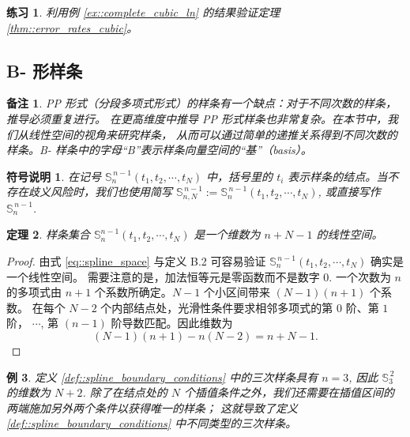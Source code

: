 \documentclass[a4paper]{ctexart}
\newtheorem{theorem}{定理}
\newtheorem{remark}{备注}
\newtheorem{notation}{符号说明}
\newtheorem{example}[theorem]{例}
\newtheorem{exercise}[theorem]{练习}
\numberwithin{theorem}{section}
\numberwithin{equation}{section}
\numberwithin{figure}{section}
\numberwithin{remark}{section}
\begin{document}
\begin{exercise}
    \label{exer::verify_thm312_by_ex38}
利用例 \ref{ex::complete_cubic_ln} 的结果验证定理 \ref{thm::error_rates_cubic}。
\end{exercise}

\subsection{B- 形样条}
\label{sec::b_form_splines}

\begin{remark}
    \label{rem::pp_form_drawback}
PP 形式（分段多项式形式）的样条有一个缺点：对于不同次数的样条，推导必须重复进行。
在更高维度中推导 PP 形式样条也非常复杂。在本节中，我们从线性空间的视角来研究样条，
从而可以通过简单的递推关系得到不同次数的样条。B- 样条中的字母“B”表示样条向量空间的“基”（basis）。
\end{remark}

\begin{notation}
    \label{not::Sn_def}
在记号 $\mathbb{S}^{\,n-1}_n(t_1,t_2,\cdots,t_N)$ 中，括号里的 $t_i$ 表示样条的结点。当不存在歧义风险时，我们也使用简写
$\mathbb{S}^{\,n-1}_{n,N}:=\mathbb{S}^{\,n-1}_n(t_1,t_2,\cdots,t_N)$, 
或直接写作 $\mathbb{S}^{\,n-1}_n$.
\end{notation}

\begin{theorem}
    \label{thm::dim_Sn}
样条集合 $\mathbb{S}^{n-1}_n(t_1,t_2,\cdots,t_N)$ 是一个维数为 $n+N-1$ 的线性空间。
\end{theorem}

\begin{proof}
由式 \eqref{eq::spline_space} 与定义 B.2 可容易验证 $\mathbb{S}^{\,n-1}_n(t_1,t_2,\cdots,t_N)$ 确实是一个线性空间。
需要注意的是，加法恒等元是零函数而不是数字 $0$. 一个次数为 $n$ 的多项式由 $n+1$ 个系数所确定。$N-1$ 个小区间带来 $(N-1)(n+1)$ 个系数。
在每个 $N-2$ 个内部结点处，光滑性条件要求相邻多项式的第 $0$ 阶、第 $1$ 阶， $\cdots$, 第 $(n-1)$ 阶导数匹配。因此维数为
\[
(N-1)(n+1)-n(N-2) = n + N - 1.
\]
\end{proof}

\begin{example}
    \label{ex::cubic_dim}
定义 \ref{def::spline_boundary_conditions} 中的三次样条具有 $n=3$, 因此 $\mathbb{S}^{\,2}_3$ 的维数为 $N+2$. 
除了在结点处的 $N$ 个插值条件之外，我们还需要在插值区间的两端施加另外两个条件以获得唯一的样条；
这就导致了定义 \ref{def::spline_boundary_conditions} 中不同类型的三次样条。
\end{example}
\end{document}
